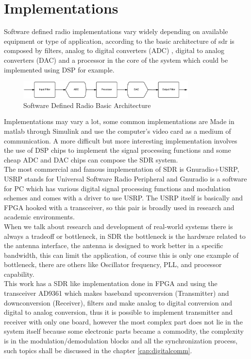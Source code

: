 \section{Implementations}

Software defined radio implementations vary widely depending on available
equipment or type of application, according to \cite{ladimer2009} the basic
architecture of sdr is composed by filters, analog to digital converters (ADC) ,
digital to analog converters (DAC) and a processor in the core of the system
which could be implemented using DSP for example.\\

\begin{figure}[htbp]
    \centering
    \includegraphics[width=0.8\textwidth]{./figures/sdr_basic_arch}
    \caption{ Software Defined Radio Basic Architecture
    \label{fig:sdr_basic}}
\end{figure}


Implementations may vary a lot, some common implementations are Made in matlab
through Simulink and use the computer’s video card as a medium of communication.
A more difficult but more interesting implementation involves the use of DSP
chips to implement the signal processing functions and some cheap ADC and DAC
chips can compose the SDR system.\\

The most commercial and famous implementation of SDR is Gnuradio+USRP, USRP
stands for Universal Software Radio Peripheral \cite{web:usrp} and Gnuradio
\cite{web:gnuradio} is a software for PC which has various digital signal
processing functions and modulation schemes and comes with a driver to use USRP.
The USRP itself is basically and FPGA hooked with a transceiver, so this pair is
broadly used in research and academic environments.\\

When we talk about research and development of real-world systems there is
always a tradeoff or bottleneck, in SDR the bottleneck is the hardware related
to the antenna interface, the antenna is designed to work better in a specific
bandwidth, this can limit the application, of course this is only one example of
bottleneck, there are others like Oscillator frequency, PLL, and processor
capability.\\

This work has a SDR like implementation done in FPGA and using the transceiver
AD9361 which makes baseband upconversion (Transmitter) and downconversion
(Receiver), filters and make analog to digital conversion and digital to analog
conversion, thus it is possible to implement transmitter and receiver with only
one board, however the most complex part does not lie in the system itself
because some electronic parts became a commodity, the complexity is in the
modulation/demodulation blocks and all the synchronization process, such topics
shall be discussed in the chapter \ref{cap:digitalcomm}.
